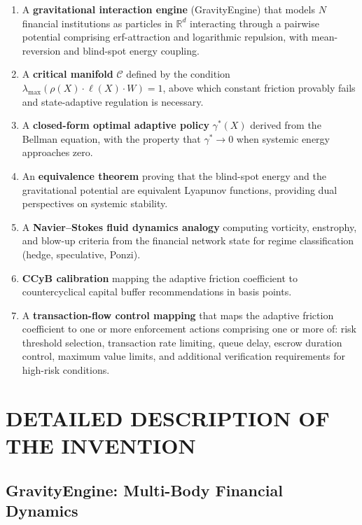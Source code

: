 \documentclass[12pt,a4paper]{article}
\begin{document}
\begin{enumerate}[label=(\roman*)]
\item A \textbf{gravitational interaction engine} (GravityEngine) that 
models $N$ financial institutions as particles in $\mathbb{R}^d$ 
interacting through a pairwise potential comprising erf-attraction and 
logarithmic repulsion, with mean-reversion and blind-spot energy coupling.

\item A \textbf{critical manifold} $\mathcal{C}$ defined by the condition 
$\lambda_{\max}(\rho(X) \cdot \ell(X) \cdot W) = 1$, above which constant 
friction provably fails and state-adaptive regulation is necessary.

\item A \textbf{closed-form optimal adaptive policy} $\gamma^*(X)$ derived 
from the Bellman equation, with the property that $\gamma^* \to 0$ when 
systemic energy approaches zero.

\item An \textbf{equivalence theorem} proving that the blind-spot energy 
and the gravitational potential are equivalent Lyapunov functions, providing 
dual perspectives on systemic stability.

\item A \textbf{Navier--Stokes fluid dynamics analogy} computing vorticity, 
enstrophy, and blow-up criteria from the financial network state for regime 
classification (hedge, speculative, Ponzi).

\item \textbf{CCyB calibration} mapping the adaptive friction coefficient 
to countercyclical capital buffer recommendations in basis points.
\item A \textbf{transaction-flow control mapping} that maps the adaptive 
friction coefficient to one or more enforcement actions comprising one or 
more of: risk threshold selection, transaction rate limiting, queue delay, 
escrow duration control, maximum value limits, and additional verification 
requirements for high-risk conditions.
\end{enumerate}

\section{DETAILED DESCRIPTION OF THE INVENTION}

\subsection{GravityEngine: Multi-Body Financial Dynamics}
\end{document}
